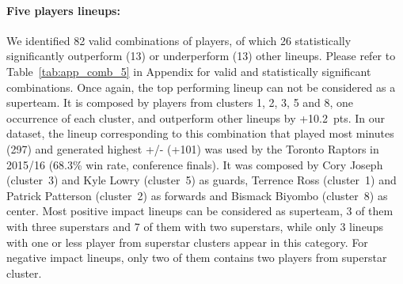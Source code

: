 \paragraph{Five players lineups:}
We identified 82 valid combinations of players, of which 26 statistically significantly outperform (13) or underperform (13) other lineups.
Please refer to Table~\ref{tab:app_comb_5} in Appendix for valid and statistically significant combinations.
Once again, the top performing lineup can not be considered as a superteam. 
It is composed by players from clusters 1, 2, 3, 5 and 8, one occurrence of each cluster, and outperform other lineups by +10.2~pts.
In our dataset, the lineup corresponding to this combination that played most minutes (297) and generated highest +/- (+101) was used by the Toronto Raptors in 2015/16 (68.3\% win rate, conference finals).
It was composed by Cory Joseph (cluster~3) and Kyle Lowry (cluster~5) as guards, Terrence Ross (cluster~1) and Patrick Patterson (cluster~2) as forwards and Bismack Biyombo (cluster~8) as center.
Most positive impact lineups can be considered as superteam, 3 of them with three superstars and 7 of them with two superstars, while only 3 lineups with one or less player from superstar clusters appear in this category.
For negative impact lineups, only two of them contains two players from superstar cluster.
